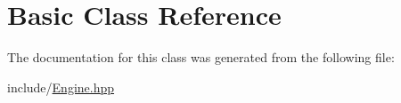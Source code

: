\hypertarget{classBasic}{}\section{Basic Class Reference}
\label{classBasic}


The documentation for this class was generated from the following file\+:\begin{DoxyCompactItemize}
\item 
include/\hyperlink{Engine_8hpp}{Engine.\+hpp}\end{DoxyCompactItemize}

